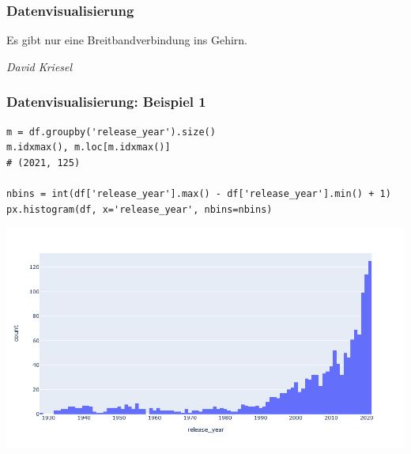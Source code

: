 %


\begin{frame}
	\frametitle{Datenvisualisierung}
	
	\epigraph{Es gibt nur eine Breitbandverbindung ins Gehirn.}{\textit{David Kriesel}}
\end{frame}


%
%


\begin{frame}[fragile]
\frametitle{Datenvisualisierung: Beispiel 1}

\begin{verbatim}
m = df.groupby('release_year').size()
m.idxmax(), m.loc[m.idxmax()]
# (2021, 125)

nbins = int(df['release_year'].max() - df['release_year'].min() + 1)
px.histogram(df, x='release_year', nbins=nbins)
\end{verbatim}

\begin{center}
	\vspace{-\baselineskip}
	\includegraphics[height=0.5\textheight]{fig5/histogram1.png}
\end{center}
\end{frame}


